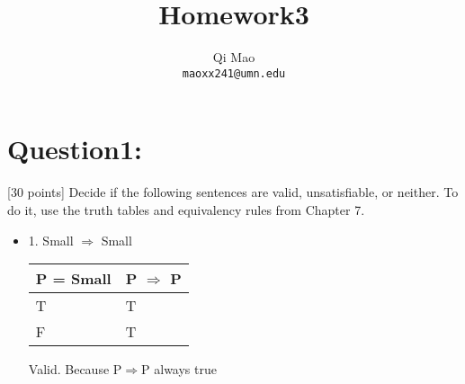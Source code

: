 \documentclass{article}
\begin{document}
\title{Homework3}
\author{Qi Mao\\
  \texttt{maoxx241@umn.edu}}
\maketitle
\section{Question1:}
[30 points] Decide if the following sentences are valid, unsatisfiable, or neither. To do it, use the truth tables and equivalency rules from Chapter 7.\break
\begin{itemize}
    \item 1.	Small $\Rightarrow$  Small
    \begin{center}
        \begin{tabular}{ |l|l|}
          \hline
          P = Small & P $\Rightarrow$ P   \\ \hline
          T & T  \\ \hline
          F & T\\
          \hline
        \end{tabular}
        \end{center}
        Valid. Because P$\Rightarrow$P always true


\end{itemize}
\end{document}
